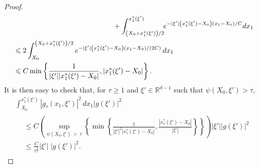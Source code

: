 \documentclass[10pt]{amsart}
\theoremstyle{definition}\newtheorem{defi}[theo]{Definition}\newtheorem{rema}[theo]{Remark}\newtheorem{exam}[theo]{Example}\newtheorem{exem}[theo]{Example}\newtheorem{nota}[theo]{Notation}
\newcommand*\R{\mathbb{R}}
\renewcommand{\leq}{\leqslant}
\renewcommand{\geq}{\geqslant}
\begin{document}
\begin{proof}
\begin{multline*}
\begin{aligned}
&\mkern250mu
 + 
\int_{\left(X_0+x_1^*(\xi')\right)/2}^{x_1^*(\xi')} \!\!e^{- |\xi'| \left(x_1^*(\xi') - X_0\right) (x_1- X_0)/C} dx_1
\\
& \leq 2 \int_{X_0}^{\left(X_0+x_1^*(\xi')\right)/2}e^{- |\xi'| \left(x_1^*(\xi') - X_0\right) (x_1 -X_0)/(2C)} \, dx_1
\\
& \leq C \min\left\{\frac{1}{|\xi'| |x_1^*(\xi')- X_0|}, \left|x_1^*(\xi')- X_0\right| \right\}.
\end{aligned}
\end{multline*}
It is then easy to check that, for $\tau \geq 1$ and $\xi' \in \R^{d-1}$ such that $\psi(X_0, \xi') > \tau$,
\begin{multline*}
\int_{X_0}^{x_1^*(\xi')} \left|g_\tau(x_1, \xi')\right|^2 \, dx_1 |g(\xi')|^2
\\
\begin{aligned}
&\leq C
\left(\!\sup_{\psi(X_0, \xi')\, >\,\tau}
\left\{
\min\left\{\frac{1}{|\xi'|^2 |x_1^*(\xi')- X_0|}, \frac{|x_1^*(\xi')\!-\! X_0|}{|\xi'|} \right\}
\right\} \right) |\xi'| |g(\xi')|^2\\
&\leq
\frac{C}{\tau^{\frac{3}{2}}} \left|\xi'\right|\; |g(\xi')|^2.
\end{aligned}
\end{multline*}


\end{proof}
\end{document}
